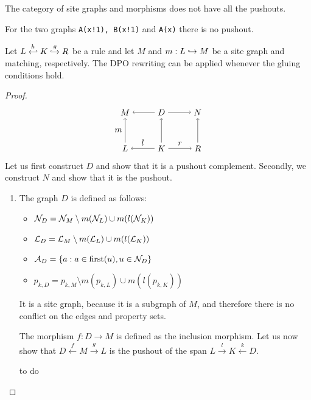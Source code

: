 The category of site graphs and morphisms does not have all the pushouts. %

\begin{example}
  For the two graphs \verb|A(x!1), B(x!1)| and \verb|A(x)| there is no pushout.
\end{example}

\begin{lemma}
  Let $L\overset{h}{\hookleftarrow} K \overset{g}{\hookrightarrow} R$ be a rule and let $M$ and $m:L\hookrightarrow M$ be a site graph and matching, respectively. The DPO rewriting can be applied whenever the gluing conditions hold.
\end{lemma}
\begin{proof}
  \[
  \begin{tikzpicture} %
    \node (l) at (-1.5,0) {\(L\)};
    \node (d) at (0,0) {\(K\)};
    \node (r) at (1.5,0) {\(R\)};
    \node (m) at (-1.5,1.5) {\(M\)};
    \node (d') at (0,1.5) {\(D\)};
    \node (n) at (1.5,1.5) {\(N\)};
    \draw [->] (d) -- node [above,midway] {\(l\)} (l);
    \draw [->] (d) -- node [above,midway] {\(r\)} (r);
    \draw [->] (d') -- (m);
    \draw [->] (d') -- (n);
    \draw [->] (l) -- node [left,midway] {\(m\)}  (m);
    \draw [->] (d) -- (d');
    \draw [->] (r) -- (n);
  \end{tikzpicture}
  \]
  Let us first construct $D$ and show that it is a pushout complement. Secondly, we construct $N$ and show that it is the pushout.
  \begin{enumerate}
  \item The graph $D$ is defined as follows:
    \begin{itemize}
    \item $\mathcal{N}_D = \mathcal{N}_M\setminus m(\mathcal{N}_L) \cup m(l(\mathcal{N}_K))$
    \item $\mathcal{L}_D = \mathcal{L}_M\setminus m(\mathcal{L}_L) \cup m(l(\mathcal{L}_K))$
    \item $\mathcal{A}_D = \{a: a\in \text{first}(u), u\in\mathcal{N}_D\}$
    \item $p_{k,D} = p_{k,M}\setminus m(p_{k,L}) \cup m(l(p_{k,K}))$
    \end{itemize}
    It is a site graph, because it is a subgraph of $M$, and therefore there is no conflict on the edges and property sets.

    The morphism $f:D\to M$ is defined as the inclusion morphism.
    Let us now show that $D\overset{f}{\leftarrow}M\overset{g}{\rightarrow} L$ is the pushout of the span $L\overset{l}{\rightarrow}K\overset{k}{\leftarrow} D$.
 \begin{mdframed}[backgroundcolor=blue!20]
    to do
  \end{mdframed}


\end{enumerate}
\end{proof}

